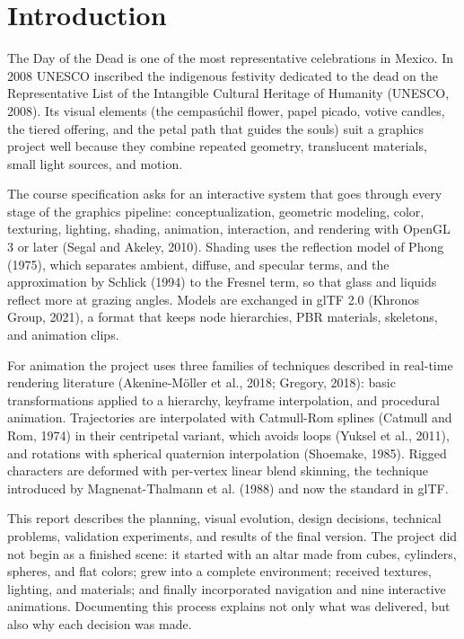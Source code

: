 \documentclass[letter,12pt]{article}
\begin{document}
	\section{Introduction}
	The Day of the Dead is one of the most representative celebrations in Mexico. In 2008 UNESCO inscribed the indigenous festivity dedicated to the dead on the Representative List of the Intangible Cultural Heritage of Humanity (UNESCO, 2008). Its visual elements (the cempasúchil flower, papel picado, votive candles, the tiered offering, and the petal path that guides the souls) suit a graphics project well because they combine repeated geometry, translucent materials, small light sources, and motion.

	The course specification asks for an interactive system that goes through every stage of the graphics pipeline: conceptualization, geometric modeling, color, texturing, lighting, shading, animation, interaction, and rendering with OpenGL 3 or later (Segal and Akeley, 2010). Shading uses the reflection model of Phong (1975), which separates ambient, diffuse, and specular terms, and the approximation by Schlick (1994) to the Fresnel term, so that glass and liquids reflect more at grazing angles. Models are exchanged in glTF 2.0 (Khronos Group, 2021), a format that keeps node hierarchies, PBR materials, skeletons, and animation clips.

	For animation the project uses three families of techniques described in real-time rendering literature (Akenine-Möller et al., 2018; Gregory, 2018): basic transformations applied to a hierarchy, keyframe interpolation, and procedural animation. Trajectories are interpolated with Catmull-Rom splines (Catmull and Rom, 1974) in their centripetal variant, which avoids loops (Yuksel et al., 2011), and rotations with spherical quaternion interpolation (Shoemake, 1985). Rigged characters are deformed with per-vertex linear blend skinning, the technique introduced by Magnenat-Thalmann et al. (1988) and now the standard in glTF.

	This report describes the planning, visual evolution, design decisions, technical problems, validation experiments, and results of the final version. The project did not begin as a finished scene: it started with an altar made from cubes, cylinders, spheres, and flat colors; grew into a complete environment; received textures, lighting, and materials; and finally incorporated navigation and nine interactive animations. Documenting this process explains not only what was delivered, but also why each decision was made.
\end{document}
